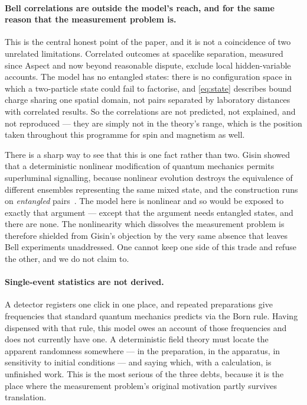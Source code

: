 \documentclass[11pt]{article}
\begin{document}
\paragraph{Bell correlations are outside the model's reach, and for the same reason that the
measurement problem is.} This is the central honest point of the paper, and it is not a coincidence
of two unrelated limitations. Correlated outcomes at spacelike separation, measured since Aspect
and now beyond reasonable dispute, exclude local hidden-variable accounts. The model has no
entangled states: there is no configuration space in which a two-particle state could fail to
factorise, and \eqref{eq:state} describes bound charge sharing one spatial domain, not pairs
separated by laboratory distances with correlated results. So the correlations are not predicted,
not explained, and not reproduced --- they are simply not in the theory's range, which is the
position taken throughout this programme for spin and magnetism as well.

There is a sharp way to see that this is one fact rather than two. Gisin showed that a deterministic
nonlinear modification of quantum mechanics permits superluminal signalling, because nonlinear
evolution destroys the equivalence of different ensembles representing the same mixed state, and
the construction runs on \emph{entangled} pairs~\cite{Gisin1990}. The model here is nonlinear and
so would be exposed to exactly that argument --- except that the argument needs entangled states,
and there are none. The nonlinearity which dissolves the measurement problem is therefore shielded
from Gisin's objection by the very same absence that leaves Bell experiments unaddressed. One
cannot keep one side of this trade and refuse the other, and we do not claim to.

\paragraph{Single-event statistics are not derived.} A detector registers one click in one place,
and repeated preparations give frequencies that standard quantum mechanics predicts via the Born
rule. Having dispensed with that rule, this model owes an account of those frequencies and does not
currently have one. A deterministic field theory must locate the apparent randomness somewhere ---
in the preparation, in the apparatus, in sensitivity to initial conditions --- and saying which,
with a calculation, is unfinished work. This is the most serious of the three debts, because it is
the place where the measurement problem's original motivation partly survives translation.
\end{document}
